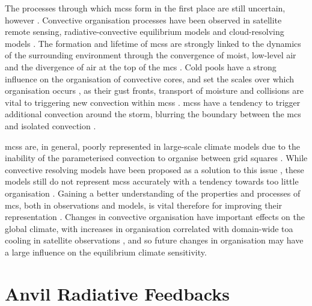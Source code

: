 The processes through which \acrshort{mcs}s form in the first place are still uncertain, however \citep{houze_100_2018}.
Convective organisation processes have been observed in satellite remote sensing, radiative-convective equilibrium models and cloud-resolving models \citep{holloway_observing_2017}. 
The formation and lifetime of \acrshort{mcs}s are strongly linked to the dynamics of the surrounding environment through the convergence of moist, low-level air and the divergence of air at the top of the \acrshort{mcs}  \citep{houze_chapter_2014}. 
Cold pools have a strong influence on the organisation of convective cores, and set the scales over which organisation occurs \citep{jeevanjee_convective_2013}, as their gust fronts, transport of moisture and collisions are vital to triggering new convection within \acrshort{mcs}s \citep{feng_mechanisms_2015}.
\acrshort{mcs}s have a tendency to trigger additional convection around the storm, blurring the boundary between the \acrshort{mcs} and isolated convection \citep{mapes_gregarious_1993}.

\acrshort{mcs}s are, in general, poorly represented in large-scale climate models due to the inability of the parameterised convection to organise between grid squares \citep{houze_100_2018}.
While convective resolving models have been proposed as a solution to this issue \citep{stevens_added_2020}, these models still do not represent \acrshort{mcs}s accurately with a tendency towards too little organisation \citep{prein_sensitivity_2021}.
Gaining a better understanding of the properties and processes of \acrshort{mcs}, both in observations and models, is vital therefore for improving their representation \citep{feng_mesoscale_2023}.
Changes in convective organisation have important effects on the global climate, with increases in organisation correlated with domain-wide \acrshort{toa} cooling in satellite observations \citep{bony_observed_2020}, and so future changes in organisation may have a large influence on the equilibrium climate sensitivity.


\section{Anvil Radiative Feedbacks} \label{sec:anvil_feedbacks}

